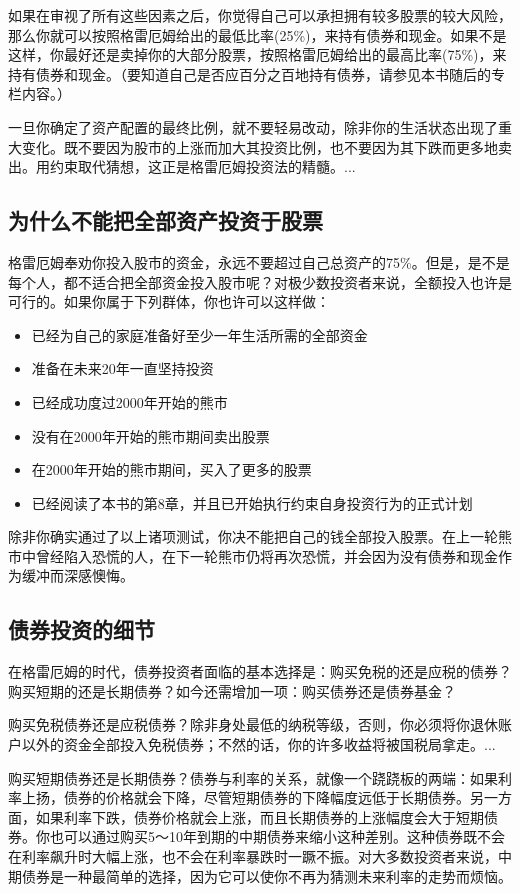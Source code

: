 \documentclass[12pt,oneside]{book}
\begin{document}
如果在审视了所有这些因素之后，你觉得自己可以承担拥有较多股票的较大风险，那么你就可以按照格雷厄姆给出的最低比率(25\%)，来持有债券和现金。如果不是这样，你最好还是卖掉你的大部分股票，按照格雷厄姆给出的最高比率(75\%)，来持有债券和现金。（要知道自己是否应百分之百地持有债券，请参见本书随后的专栏内容。）

一旦你确定了资产配置的最终比例，就不要轻易改动，除非你的生活状态出现了重大变化。既不要因为股市的上涨而加大其投资比例，也不要因为其下跌而更多地卖出。用约束取代猜想，这正是格雷厄姆投资法的精髓。...


\subsection{为什么不能把全部资产投资于股票}
格雷厄姆奉劝你投入股市的资金，永远不要超过自己总资产的75\%。但是，是不是每个人，都不适合把全部资金投入股市呢？对极少数投资者来说，全额投入也许是可行的。如果你属于下列群体，你也许可以这样做：

\begin{itemize}
\item 已经为自己的家庭准备好至少一年生活所需的全部资金
\item 准备在未来20年一直坚持投资
\item 已经成功度过2000年开始的熊市
\item 没有在2000年开始的熊市期间卖出股票
\item 在2000年开始的熊市期间，买入了更多的股票
\item 已经阅读了本书的第8章，并且已开始执行约束自身投资行为的正式计划

\end{itemize}

除非你确实通过了以上诸项测试，你决不能把自己的钱全部投入股票。在上一轮熊市中曾经陷入恐慌的人，在下一轮熊市仍将再次恐慌，并会因为没有债券和现金作为缓冲而深感懊悔。

\subsection{债券投资的细节}
在格雷厄姆的时代，债券投资者面临的基本选择是：购买免税的还是应税的债券？购买短期的还是长期债券？如今还需增加一项：购买债券还是债券基金？

购买免税债券还是应税债券？除非身处最低的纳税等级，否则，你必须将你退休账户以外的资金全部投入免税债券；不然的话，你的许多收益将被国税局拿走。...

购买短期债券还是长期债券？债券与利率的关系，就像一个跷跷板的两端：如果利率上扬，债券的价格就会下降，尽管短期债券的下降幅度远低于长期债券。另一方面，如果利率下跌，债券价格就会上涨，而且长期债券的上涨幅度会大于短期债券。你也可以通过购买5～10年到期的中期债券来缩小这种差别。这种债券既不会在利率飙升时大幅上涨，也不会在利率暴跌时一蹶不振。对大多数投资者来说，中期债券是一种最简单的选择，因为它可以使你不再为猜测未来利率的走势而烦恼。
\end{document}
